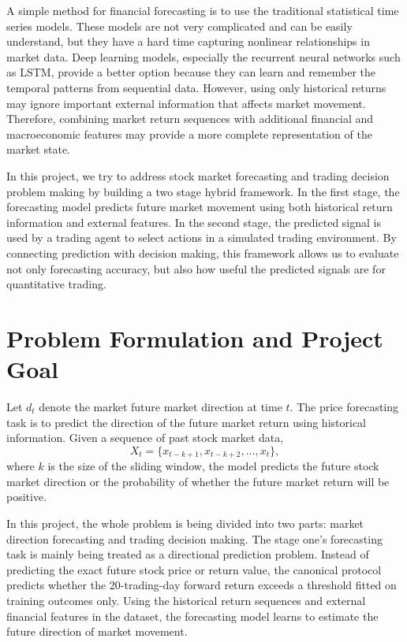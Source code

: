 \documentclass{article}
\begin{document}
A simple method for financial forecasting is to use the traditional statistical time series models. These models are not very complicated and can be easily understand, but they have a hard time capturing nonlinear relationships in market data. Deep learning models, especially the recurrent neural networks such as LSTM, provide a better option because they can learn and remember the temporal patterns from sequential data. However, using only historical returns may ignore important external information that affects market movement. Therefore, combining market return sequences with additional financial and macroeconomic features may provide a more complete representation of the market state.

In this project, we try to address stock market forecasting and trading decision problem making by building a two stage hybrid framework. In the first stage, the forecasting model predicts future market movement using both historical return information and external features. In the second stage, the predicted signal is used by a trading agent to select actions in a simulated trading environment. By connecting prediction with decision making, this framework allows us to evaluate not only forecasting accuracy, but also how useful the predicted signals are for quantitative trading.

\section{Problem Formulation and Project Goal}

Let $d_t$ denote the market future market direction at time $t$. The price forecasting task is to predict the direction of the future market return using historical information. Given a sequence of past stock market data,
\[
X_t = \{x_{t-k+1}, x_{t-k+2}, \ldots, x_t\},
\]
where $k$ is the size of the sliding window, the model predicts the future stock market direction or the probability of whether the future market return will be positive.

In this project, the whole problem is being divided into two parts: market direction forecasting and trading decision making. The stage one's forecasting task is mainly being treated as a directional prediction problem. Instead of predicting the exact future stock price or return value, the canonical protocol predicts whether the 20-trading-day forward return exceeds a threshold fitted on training outcomes only. Using the historical return sequences and external financial features in the dataset, the forecasting model learns to estimate the future direction of market movement.
\end{document}
